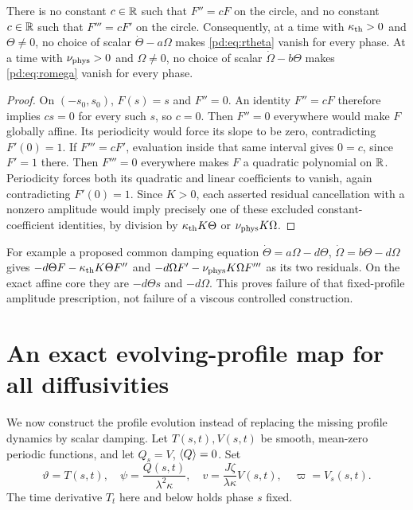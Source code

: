\begin{pdproposition}\label{pd:prop:noeig}
There is no constant $c\in\mathbb R$ such that $F''=cF$ on the circle, and no
constant $c\in\mathbb R$ such that $F'''=cF'$ on the circle. Consequently, at
a time with $\kappa_{\rm th}>0$ and $\Theta\ne0$, no choice of scalar
$\dot\Theta-a\Omega$ makes \eqref{pd:eq:rtheta} vanish for every phase.
At a time with $\nu_{\rm phys}>0$ and $\Omega\ne0$, no choice of scalar
$\dot\Omega-b\Theta$ makes \eqref{pd:eq:romega} vanish for every phase.
\end{pdproposition}
\begin{proof}
On $(-s_0,s_0)$, $F(s)=s$ and $F''=0$. An identity $F''=cF$ therefore
implies $cs=0$ for every such $s$, so $c=0$. Then $F''=0$ everywhere
would make $F$ globally affine. Its periodicity would force its slope to be
zero, contradicting $F'(0)=1$.
If $F'''=cF'$, evaluation inside that same interval gives $0=c$, since
$F'=1$ there. Then $F'''=0$ everywhere makes $F$ a quadratic polynomial
on $\mathbb R$. Periodicity forces both its quadratic and linear coefficients
to vanish, again contradicting $F'(0)=1$.
Since $K>0$, each asserted residual cancellation with a nonzero amplitude
would imply precisely one of these excluded constant-coefficient
identities, by division by $\kappa_{\rm th} K\Theta$ or $\nu_{\rm phys} K\Omega$.
\end{proof}

For example a proposed common damping equation
$\dot\Theta=a\Omega-d\Theta$, $\dot\Omega=b\Theta-d\Omega$ gives
$-d\Theta F-\kappa_{\rm th} K\Theta F''$ and
$-d\Omega F'-\nu_{\rm phys} K\Omega F'''$ as its two residuals. On the exact affine
core they are $-d\Theta s$ and $-d\Omega$.
This proves failure of that fixed-profile amplitude prescription, not
failure of a viscous controlled construction.

\section{An exact evolving-profile map for all diffusivities}

We now construct the profile evolution instead of replacing the missing
profile dynamics by scalar damping. Let $T(s,t),V(s,t)$ be smooth,
mean-zero periodic functions, and let $Q_s=V$, $\langle Q\rangle=0$. Set
\begin{equation}\label{pd:eq:generalprofile}
 \vartheta=T(s,t),\quad \psi=\frac{Q(s,t)}{\lambda^2\kappa},\quad
 v=\frac{J\zeta}{\lambda\kappa}V(s,t),\quad \varpi=V_s(s,t).
\end{equation}
The time derivative $T_t$ here and below holds phase $s$ fixed.

